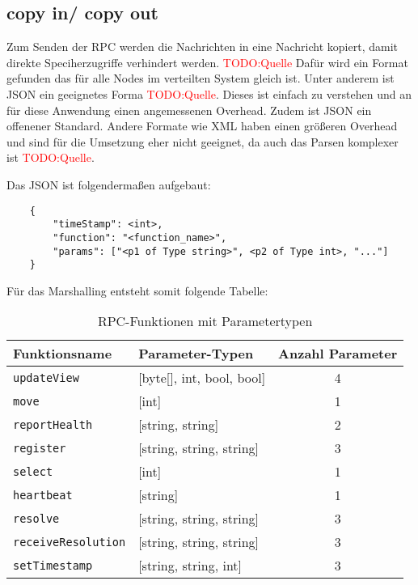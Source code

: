 \subsection{copy in/ copy out}
Zum Senden der RPC werden die Nachrichten in eine Nachricht kopiert, damit direkte Speciherzugriffe verhindert werden.  \textcolor{red}{TODO:Quelle} Dafür wird ein Format gefunden das für alle Nodes im verteilten System gleich ist. Unter anderem ist JSON ein geeignetes Forma  \textcolor{red}{TODO:Quelle}.  Dieses ist einfach zu verstehen und an für diese Anwendung einen angemessenen Overhead. Zudem ist JSON ein offenener Standard. Andere Formate wie XML haben einen größeren Overhead und sind für die Umsetzung eher nicht geeignet, da auch das Parsen komplexer ist  \textcolor{red}{TODO:Quelle}.  


Das JSON ist folgendermaßen aufgebaut:

\begin{verbatim}
	{
		"timeStamp": <int>,
		"function": "<function_name>",
		"params": ["<p1 of Type string>", <p2 of Type int>, "..."]
	}
\end{verbatim}


Für das Marshalling entsteht somit folgende Tabelle:


\begin{table}[h!]
	\centering
	\begin{tabular}{|l|l|c|}
		\hline
		\textbf{Funktionsname} & \textbf{Parameter-Typen} & \textbf{Anzahl Parameter} \\
		\hline
		\texttt{updateView} & [byte[], int, bool, bool] & 4 \\
		\texttt{move} & [int] & 1 \\
		\texttt{reportHealth} & [string, string] & 2 \\
		\texttt{register} & [string, string, string] & 3 \\
		\texttt{select} & [int] & 1 \\
		\texttt{heartbeat} & [string] & 1 \\
		\texttt{resolve} & [string, string, string] & 3 \\
		\texttt{receiveResolution} & [string, string, string] & 3 \\
		\texttt{setTimestamp} & [string, string, int] & 3 \\
		
		\hline
	\end{tabular}
	\caption{RPC-Funktionen mit Parametertypen}
\end{table}

